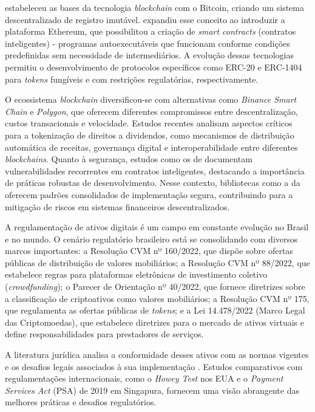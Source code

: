 \documentclass[12pt, a4paper, oneside, openright, chapter=TITLE]{abntex2}
\begin{document}
 estabeleceu as bases da tecnologia \textit{blockchain} com o Bitcoin, criando um sistema descentralizado de registro imutável.  expandiu esse conceito ao introduzir a plataforma Ethereum, que possibilitou a criação de \textit{smart contracts} (contratos inteligentes) - programas autoexecutáveis que funcionam conforme condições predefinidas sem necessidade de intermediários. A evolução dessas tecnologias permitiu o desenvolvimento de protocolos específicos como ERC-20 e ERC-1404 para \textit{tokens} fungíveis e com restrições regulatórias, respectivamente.

O ecossistema \textit{blockchain} diversificou-se com alternativas como \textit{Binance Smart Chain} e \textit{Polygon}, que oferecem diferentes compromissos entre descentralização, custos transacionais e velocidade. Estudos recentes \cite{wang2023smart, kaal2022defi, beck2021real} analisam aspectos críticos para a tokenização de direitos a dividendos, como mecanismos de distribuição automática de receitas, governança digital e interoperabilidade entre diferentes \textit{blockchains}. Quanto à segurança, estudos como os de  documentam vulnerabilidades recorrentes em contratos inteligentes, destacando a importância de práticas robustas de desenvolvimento. Nesse contexto, bibliotecas como a da  oferecem padrões consolidados de implementação segura, contribuindo para a mitigação de riscos em sistemas financeiros descentralizados.

A regulamentação de ativos digitais é um campo em constante evolução no Brasil e no mundo. O cenário regulatório brasileiro está se consolidando com diversos marcos importantes: a Resolução CVM nº 160/2022, que dispõe sobre ofertas públicas de distribuição de valores mobiliários; a Resolução CVM nº 88/2022, que estabelece regras para plataformas eletrônicas de investimento coletivo (\textit{crowdfunding}); o Parecer de Orientação nº 40/2022, que fornece diretrizes sobre a classificação de criptoativos como valores mobiliários; a Resolução CVM nº 175, que regulamenta as ofertas públicas de \textit{tokens}; e a Lei 14.478/2022 (Marco Legal das Criptomoedas), que estabelece diretrizes para o mercado de ativos virtuais e define responsabilidades para prestadores de serviços. 

A literatura jurídica analisa a conformidade desses ativos com as normas vigentes \cite{dias2020} e os desafios legais associados à sua implementação \cite{barreto2022}. Estudos comparativos com regulamentações internacionais, como o \textit{Howey Test} nos EUA e o \textit{Payment Services Act} (PSA) de 2019 em Singapura, fornecem uma visão abrangente das melhores práticas e desafios regulatórios.
\end{document}
